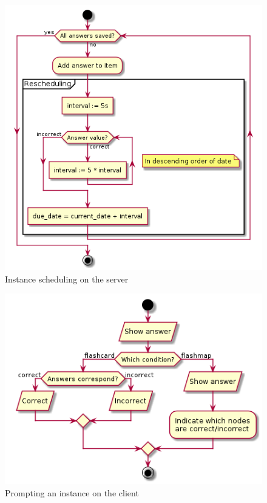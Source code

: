 \begin{figure}[h!]
\centering
\includegraphics[width=\textwidth]{img/learningserver.png}
\caption{Instance scheduling on the server}
\end{figure}
\begin{figure}[h!]
\centering
\includegraphics[width=\textwidth]{img/learningclient.png}
\caption{Prompting an instance on the client}
\end{figure}
